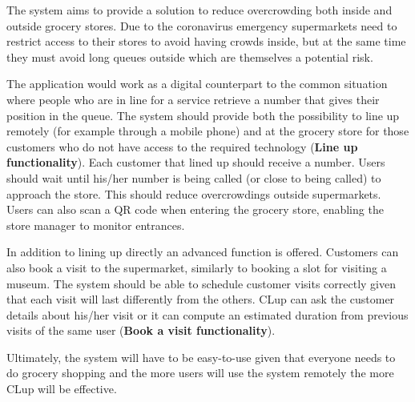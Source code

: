 The system aims to provide a solution to reduce overcrowding both inside and outside grocery stores.
Due to the coronavirus emergency supermarkets need to restrict access to their stores to avoid having crowds inside, but at the same time they must avoid long queues outside which are themselves a potential risk.

\medskip
The application would work as a digital counterpart to the common situation where people who are in line for a service retrieve a number that gives their position in the queue.
The system should provide both the possibility to line up remotely (for example through a mobile phone) and at the grocery store for those customers who do not have access to the required technology (\textbf{Line up functionality}).
Each customer that lined up should receive a number. Users should wait until his/her number is being called (or close to being called) to approach the store. This should reduce overcrowdings outside supermarkets.
Users can also scan a QR code when entering the grocery store, enabling the store manager to monitor entrances.

\medskip
In addition to lining up directly an advanced function is offered. Customers can also book a visit to the supermarket, similarly to booking a slot for visiting a museum. The system should be able to schedule customer visits correctly given that each visit will last differently from the others.  
CLup can ask the customer details about his/her visit or it can compute an estimated duration from previous visits of the same user (\textbf{Book a visit functionality}).

\medskip
Ultimately, the system will have to be easy-to-use given that everyone needs to do grocery shopping and the more users will use the system remotely the more CLup will be effective.

